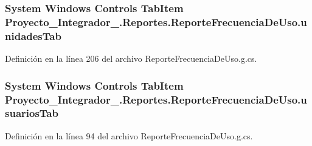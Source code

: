 \hypertarget{class_proyecto___integrador__3_1_1_reportes_1_1_reporte_frecuencia_de_uso_a583dbbaea246bdc1979eb787c835d116}{
\subsubsection[{unidades\-Tab}]{\setlength{\rightskip}{0pt plus 5cm}System Windows Controls Tab\-Item Proyecto\-\_\-\-Integrador\-\_.\-Reportes.\-Reporte\-Frecuencia\-De\-Uso.\-unidades\-Tab\hspace{0.3cm}{\ttfamily [package]}}}\label{class_proyecto___integrador__3_1_1_reportes_1_1_reporte_frecuencia_de_uso_a583dbbaea246bdc1979eb787c835d116}


Definición en la línea 206 del archivo Reporte\-Frecuencia\-De\-Uso.\-g.\-cs.

\hypertarget{class_proyecto___integrador__3_1_1_reportes_1_1_reporte_frecuencia_de_uso_a500d4eea9dad49ea8fb51fadc659b71b}{
\subsubsection[{usuarios\-Tab}]{\setlength{\rightskip}{0pt plus 5cm}System Windows Controls Tab\-Item Proyecto\-\_\-\-Integrador\-\_.\-Reportes.\-Reporte\-Frecuencia\-De\-Uso.\-usuarios\-Tab\hspace{0.3cm}{\ttfamily [package]}}}\label{class_proyecto___integrador__3_1_1_reportes_1_1_reporte_frecuencia_de_uso_a500d4eea9dad49ea8fb51fadc659b71b}


Definición en la línea 94 del archivo Reporte\-Frecuencia\-De\-Uso.\-g.\-cs.



